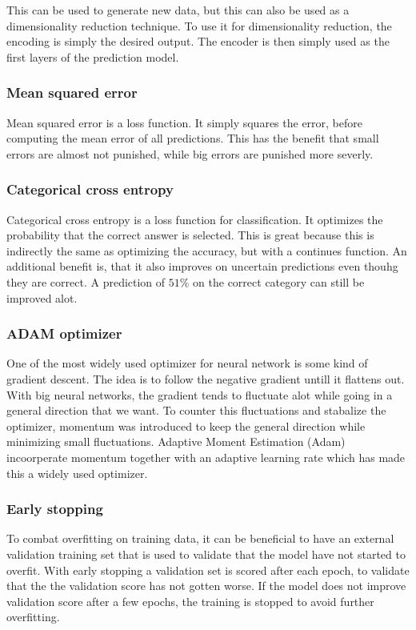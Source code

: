 This can be used to generate new data, but this can also be used as a dimensionality reduction technique.
To use it for dimensionality reduction, the encoding is simply the desired output.
The encoder is then simply used as the first layers of the prediction model.


\subsubsection{Mean squared error} %
\label{ssub:mean_squared_error}
Mean squared error is a loss function.
It simply squares the error, before computing the mean error of all predictions.
This has the benefit that small errors are almost not punished, while big errors are punished more severly.

\subsubsection{Categorical cross entropy} %
\label{ssub:categorical_cross_entropy}
Categorical cross entropy is a loss function for classification.
It optimizes the probability that the correct answer is selected.
This is great because this is indirectly the same as optimizing the accuracy, but with a continues function.
An additional benefit is, that it also improves on uncertain predictions even thouhg they are correct.
A prediction of $51\%$ on the correct category can still be improved alot.


\subsubsection{ADAM optimizer} %
\label{ssub:adam_optimizer}
One of the most widely used optimizer for neural network is some kind of gradient descent.
The idea is to follow the negative gradient untill it flattens out.
With big neural networks, the gradient tends to fluctuate alot while going in a general direction that we want.
To counter this fluctuations and stabalize the optimizer, momentum was introduced to keep the general direction while minimizing small fluctuations.
Adaptive Moment Estimation (Adam) incoorperate momentum together with an adaptive learning rate which has made this a widely used optimizer.

\subsubsection{Early stopping} %
\label{ssub:early_stopping}
To combat overfitting on training data, it can be beneficial to have an external validation training set that is used to validate that the model have not started to overfit.
With early stopping a validation set is scored after each epoch, to validate that the the validation score has not gotten worse.
If the model does not improve validation score after a few epochs, the training is stopped to avoid further overfitting.

